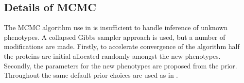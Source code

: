 \documentclass[12pt,english]{article}
\begin{document}
\subsection{Details of MCMC}
The MCMC algorithm use in \cite{Crook:2018} is insufficient to handle inference of unknown phenotypes. A collapsed Gibbs sampler approach is used, but a number of modifications are made. Firstly, to accelerate convergence of the algorithm half the proteins are initial allocated randomly amongst the new phenotypes. Secondly, the parameters for the new phenotypes are proposed from the prior. Throughout the same default prior choices are used as in \cite{Crook:2018}.

\clearpage


\end{document}
